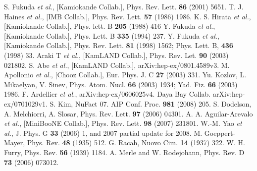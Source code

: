 \begin{thebibliography}{99}
S. Fukuda \textit{et al.}, [Kamiokande Collab.], Phys.   Rev. Lett. \textbf{86} (2001) 5651.
T. J. Haines \textit{et al.}, [IMB Collab.], Phys. Rev.  
Lett. \textbf{57} (1986) 1986.
K. S. Hirata \textit{et al.}, [Kamiokande Collab.],  
Phys. lett. B \textbf{205} (1988) 416
Y. Fukuda \textit{et al.}, [Kamiokande Collab.], Phys.  
Lett. B \textbf{335} (1994) 237.
Y. Fukuda \textit{et al.}, [Kamiokande Collab.], Phys.  
Rev. Lett. \textbf{81} (1998) 1562; Phys. Lett. B, \textbf{436}  
(1998) 33.
Araki T \textit{et al.}, [KamLAND Collab.], Phys. Rev.   Let. \textbf{90} (2003) 021802.
S. Abe \textit{et al.}, [KamLAND Collab.],   arXiv:hep-ex/0801.4589v3.
M. Apollonio \textit{et al.}, [Chooz Collab.], Eur.   Phys. J. C \textbf{27} (2003) 331.
Yu. Kozlov, L. Mikaelyan, V. Sinev, Phys. Atom. Nucl.   \textbf{66} (2003) 1934; Yad. Fiz. \textbf{66} (2003) 1986.
F. Ardellier \textit{et al.}, arXiv:hep-ex/0606025v4.
Daya Bay Collab. arXiv:hep-ex/0701029v1.
S. Kim, NuFact 07. AIP Conf. Proc. \textbf{981} (2008)   205.
S. Dodelson, A. Melchiorri, A. Slosar, Phys. Rev. Lett.   \textbf{97} (2006) 04301.
A. A. Aguilar-Arevalo \textit{et al.}, [MiniBooNE   Collab.], Phys. Rev. Lett. \textbf{98} (2007) 231801.
W.-M. Yao \textit{et al.}, J. Phys. G \textbf{33}   (2006) 1, and 2007 partial update for 2008.
M. Goeppert-Mayer, Phys. Rev. \textbf{48} (1935) 512.
G. Racah, Nuovo Cim. \textbf{14} (1937) 322.
W. H. Furry, Phys. Rev. \textbf{56} (1939) 1184.
A. Merle and W. Rodejohann, Phys. Rev. D \textbf{73} (2006) 073012.

\end{thebibliography}


